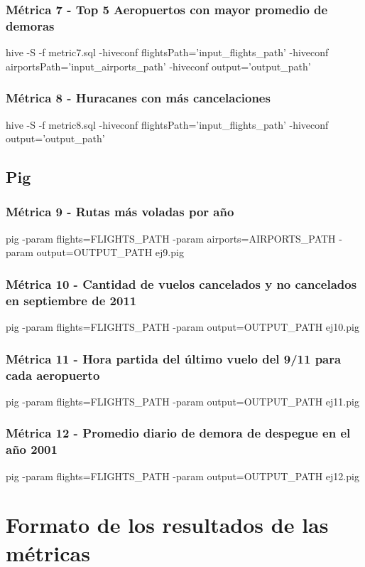\documentclass[a4paper,10pt]{article}
\begin{document}
        \subsubsection{Métrica 7 - Top 5 Aeropuertos con mayor promedio de demoras}
        \footnotesize{hive -S -f metric7.sql -hiveconf flightsPath='input\_flights\_path' -hiveconf airportsPath='input\_airports\_path' -hiveconf output='output\_path'}
        \subsubsection{Métrica 8 - Huracanes con más cancelaciones}
        \footnotesize{hive -S -f metric8.sql -hiveconf flightsPath='input\_flights\_path' -hiveconf output='output\_path'}

    \subsection{Pig}
        \subsubsection{Métrica 9 - Rutas más voladas por año}
            \footnotesize{pig -param flights=FLIGHTS\_PATH -param airports=AIRPORTS\_PATH -param output=OUTPUT\_PATH ej9.pig}
        \subsubsection{Métrica 10 - Cantidad de vuelos cancelados y no cancelados en septiembre de 2011}
            \footnotesize{pig -param flights=FLIGHTS\_PATH -param output=OUTPUT\_PATH ej10.pig}
        \subsubsection{Métrica 11 - Hora partida del último vuelo del 9/11 para cada aeropuerto}
            \footnotesize{pig -param flights=FLIGHTS\_PATH -param output=OUTPUT\_PATH ej11.pig}
        \subsubsection{Métrica 12 - Promedio diario de demora de despegue en el año 2001 }
            \footnotesize{pig -param flights=FLIGHTS\_PATH -param output=OUTPUT\_PATH ej12.pig}

\small
\section{Formato de los resultados de las métricas}
\end{document}
